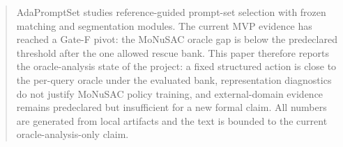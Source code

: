 \begin{abstract}
AdaPromptSet studies reference-guided prompt-set selection with frozen matching and segmentation modules. The current MVP evidence has reached a Gate-F pivot: the MoNuSAC oracle gap is below the predeclared threshold after the one allowed rescue bank. This paper therefore reports the oracle-analysis state of the project: a fixed structured action is close to the per-query oracle under the evaluated bank, representation diagnostics do not justify MoNuSAC policy training, and external-domain evidence remains predeclared but insufficient for a new formal claim. All numbers are generated from local artifacts and the text is bounded to the current oracle-analysis-only claim.
\end{abstract}
